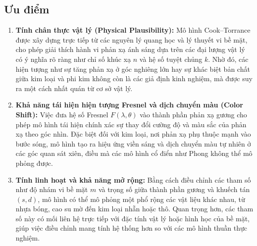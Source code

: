 \subsection{Ưu điểm}
\begin{enumerate}
	\item \textbf{Tính chân thực vật lý (Physical Plausibility):}  
	Mô hình Cook--Torrance được xây dựng trực tiếp từ các nguyên lý quang học và lý thuyết vi bề mặt, cho phép giải thích hành vi phản xạ ánh sáng dựa trên các đại lượng vật lý có ý nghĩa rõ ràng như chỉ số khúc xạ $n$ và hệ số tuyệt chủng $k$. Nhờ đó, các hiện tượng như sự tăng phản xạ ở góc nghiêng lớn hay sự khác biệt bản chất giữa kim loại và phi kim không còn là các giả định kinh nghiệm, mà được suy ra một cách nhất quán từ cơ sở vật lý.
	
	\item \textbf{Khả năng tái hiện hiện tượng Fresnel và dịch chuyển màu (Color Shift):}  
	Việc đưa hệ số Fresnel $F(\lambda, \theta)$ vào thành phần phản xạ gương cho phép mô hình tái hiện chính xác sự thay đổi cường độ và màu sắc của phản xạ theo góc nhìn. Đặc biệt đối với kim loại, nơi phản xạ phụ thuộc mạnh vào bước sóng, mô hình tạo ra hiệu ứng viền sáng và dịch chuyển màu tự nhiên ở các góc quan sát xiên, điều mà các mô hình cổ điển như Phong không thể mô phỏng được.
	
	\item \textbf{Tính linh hoạt và khả năng mở rộng:}  
	Bằng cách điều chỉnh các tham số như độ nhám vi bề mặt $m$ và trọng số giữa thành phần gương và khuếch tán $(s, d)$, mô hình có thể mô phỏng một phổ rộng các vật liệu khác nhau, từ nhựa bóng, cao su mờ đến kim loại nhẵn hoặc thô. Quan trọng hơn, các tham số này có mối liên hệ trực tiếp với đặc tính vật lý hoặc hình học của bề mặt, giúp việc điều chỉnh mang tính hệ thống hơn so với các mô hình thuần thực nghiệm.
\end{enumerate}

